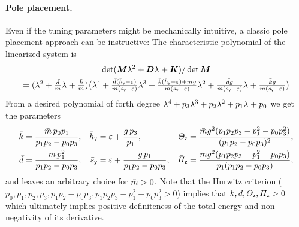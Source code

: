 \paragraph{Pole placement.}
Even if the tuning parameters might be mechanically intuitive, a classic pole placement approach can be instructive:
The characteristic polynomial of the linearized system is
\begin{multline}
 \det(\bar{\boldsymbol{M}} \lambda_{}^2 + \bar{\boldsymbol{D}} \lambda_{} + \bar{\boldsymbol{K}}) / \det\bar{\boldsymbol{M}}
\\
 = (\lambda_{}^2 + \tfrac{\bar{d}}{\bar{m}} \lambda_{} + \tfrac{\bar{k}}{\bar{m}})
 \big(\lambda_{}^4
 + \tfrac{\bar{d}(\bar{h}_{\mathsf{y}}-\varepsilon)}{\bar{m}(\bar{s}_{\mathsf{y}}-\varepsilon)} \lambda_{}^3
 + \tfrac{\bar{k}(\bar{h}_{\mathsf{y}}-\varepsilon) + \bar{m} g}{\bar{m}(\bar{s}_{\mathsf{y}}-\varepsilon)} \lambda_{}^2
 + \tfrac{\bar{d} g}{\bar{m} (\bar{s}_{\mathsf{y}}-\varepsilon)} \lambda_{}
 + \tfrac{\bar{k} g}{\bar{m} (\bar{s}_{\mathsf{y}}-\varepsilon)} \big)
\end{multline}
From a desired polynomial of forth degree $\lambda_{}^4 + p_3 \lambda_{}^3 + p_2 \lambda_{}^2 + p_1 \lambda_{} + p_0$ we get the parameters
\begin{align}
 \bar{k} &= \frac{\bar{m} \, p_0 p_1}{p_1 p_2 - p_0 p_3},&
 \bar{h}_{\mathsf{y}} &= \varepsilon + \frac{g\, p_3}{p_1},&
 \bar{\varTheta}_{\mathsf{z}} &= \frac{\bar{m} g^2 (p_1 p_2 p_3 - p_1^2 - p_0 p_3^2)}{(p_1 p_2 - p_0 p_3)^2},
\\
 \bar{d} &= \frac{\bar{m}\, p_1^2}{p_1 p_2 - p_0 p_3},&
 \bar{s}_{\mathsf{y}} &= \varepsilon + \frac{g\, p_1}{p_1 p_2 - p_0 p_3},&
 \bar{\varPi}_{\mathsf{z}} &= \frac{\bar{m} g^2 (p_1 p_2 p_3 - p_1^2 - p_0 p_3)}{p_1 (p_1 p_2 - p_0 p_3)}, 
\end{align}
and leaves an arbitrary choice for $\bar{m} > 0$.
Note that the Hurwitz criterion ($p_0, p_1, p_2, p_3, p_1 p_2 - p_0 p_3, p_1 p_2 p_3 - p_1^2 - p_0 p_3^2 > 0$) implies that $\bar{k}, \bar{d}, \bar{\varTheta}_{\mathsf{z}}, \bar{\varPi}_{\mathsf{z}} > 0$ which ultimately implies positive definiteness of the total energy and non-negativity of its derivative.

